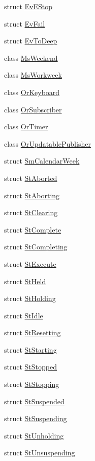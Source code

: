 \begin{DoxyCompactItemize}
\item 
struct \hyperlink{structsm__calendar__week_1_1EvEStop}{Ev\+E\+Stop}
\item 
struct \hyperlink{structsm__calendar__week_1_1EvFail}{Ev\+Fail}
\item 
struct \hyperlink{structsm__calendar__week_1_1EvToDeep}{Ev\+To\+Deep}
\item 
class \hyperlink{classsm__calendar__week_1_1MsWeekend}{Ms\+Weekend}
\item 
class \hyperlink{classsm__calendar__week_1_1MsWorkweek}{Ms\+Workweek}
\item 
class \hyperlink{classsm__calendar__week_1_1OrKeyboard}{Or\+Keyboard}
\item 
class \hyperlink{classsm__calendar__week_1_1OrSubscriber}{Or\+Subscriber}
\item 
class \hyperlink{classsm__calendar__week_1_1OrTimer}{Or\+Timer}
\item 
class \hyperlink{classsm__calendar__week_1_1OrUpdatablePublisher}{Or\+Updatable\+Publisher}
\item 
struct \hyperlink{structsm__calendar__week_1_1SmCalendarWeek}{Sm\+Calendar\+Week}
\item 
struct \hyperlink{structsm__calendar__week_1_1StAborted}{St\+Aborted}
\item 
struct \hyperlink{structsm__calendar__week_1_1StAborting}{St\+Aborting}
\item 
struct \hyperlink{structsm__calendar__week_1_1StClearing}{St\+Clearing}
\item 
struct \hyperlink{structsm__calendar__week_1_1StComplete}{St\+Complete}
\item 
struct \hyperlink{structsm__calendar__week_1_1StCompleting}{St\+Completing}
\item 
struct \hyperlink{structsm__calendar__week_1_1StExecute}{St\+Execute}
\item 
struct \hyperlink{structsm__calendar__week_1_1StHeld}{St\+Held}
\item 
struct \hyperlink{structsm__calendar__week_1_1StHolding}{St\+Holding}
\item 
struct \hyperlink{structsm__calendar__week_1_1StIdle}{St\+Idle}
\item 
struct \hyperlink{structsm__calendar__week_1_1StResetting}{St\+Resetting}
\item 
struct \hyperlink{structsm__calendar__week_1_1StStarting}{St\+Starting}
\item 
struct \hyperlink{structsm__calendar__week_1_1StStopped}{St\+Stopped}
\item 
struct \hyperlink{structsm__calendar__week_1_1StStopping}{St\+Stopping}
\item 
struct \hyperlink{structsm__calendar__week_1_1StSuspended}{St\+Suspended}
\item 
struct \hyperlink{structsm__calendar__week_1_1StSuspending}{St\+Suspending}
\item 
struct \hyperlink{structsm__calendar__week_1_1StUnholding}{St\+Unholding}
\item 
struct \hyperlink{structsm__calendar__week_1_1StUnsuspending}{St\+Unsuspending}
\end{DoxyCompactItemize}
